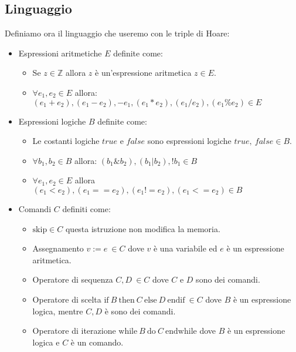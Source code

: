 \subsection{Linguaggio}
Definiamo ora il linguaggio che useremo con le triple di Hoare:
\begin{itemize}
    \item Espressioni aritmetiche $E$ definite come:
          \begin{itemize}
              \item Se $z \in \mathbb{Z}$ allora $z$ è un'espressione aritmetica
                    $z \in E$.
              \item $\forall e_1, e_2 \in E$ allora: $(e_1 + e_2), (e_1 - e_2),
                        - e_1, (e_1 \ast e_2), (e_1 / e_2), (e_1 \% e_2) \in E$
          \end{itemize}
    \item Espressioni logiche $B$ definite come:
          \begin{itemize}
              \item Le costanti logiche $true$ e $false$ sono espressioni logiche
                    $true, \ false \in B$.
              \item $\forall b_1, b_2 \in B$ allora: $ (b_1 \& b_2), (b_1 | b_2),
                        !b_1 \in B$
              \item $\forall e_1,e_2\in E$ allora $(e_1 < e_2), (e_1 == e_2),
                        (e_1 != e_2 ), (e_1 <= e_2) \in B$
          \end{itemize}
    \item Comandi $C$ definiti come:
          \begin{itemize}
              \item $\text{skip} \in C$ questa istruzione non modifica la memoria.
              \item Assegnamento $v := e \ \in C$ dove $v$ è una variabile ed $e$
                    è un espressione aritmetica.
              \item Operatore di sequenza $C, D \ \in C $ dove $C$ e $D$ sono dei
                    comandi.
              \item Operatore di scelta $\text{if} \ B \ \text{then} \ C \
                        \text{else} \ D \ \text{endif} \ \in C$ dove $B$ è un
                    espressione logica, mentre $C, D$ è sono dei comandi.
              \item Operatore di iterazione $\text{while} \ B \ \text{do} \ C \
                        \text{endwhile}$ dove $B$ è un espressione logica
                    e $C$ è un comando.
          \end{itemize}
\end{itemize}
